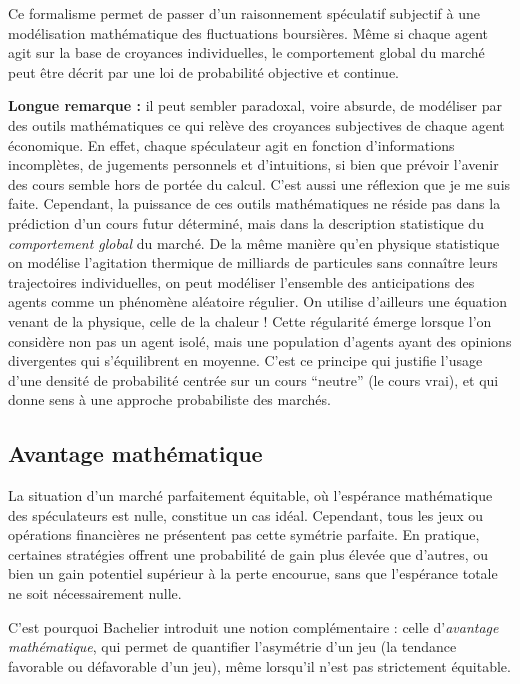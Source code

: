 \documentclass[12pt,a4paper]{article}
\begin{document}
\medskip

Ce formalisme permet de passer d’un raisonnement spéculatif subjectif à une modélisation mathématique des fluctuations boursières. Même si chaque agent agit sur la base de croyances individuelles, le comportement global du marché peut être décrit par une loi de probabilité objective et continue.

\medskip

\noindent
\textbf{Longue remarque : } il peut sembler paradoxal, voire absurde, de modéliser par des outils mathématiques ce qui relève des croyances subjectives de chaque agent économique. En effet, chaque spéculateur agit en fonction d'informations incomplètes, de jugements personnels et d’intuitions, si bien que prévoir l’avenir des cours semble hors de portée du calcul. C'est aussi une réflexion que je me suis faite. Cependant, la puissance de ces outils mathématiques ne réside pas dans la prédiction d’un cours futur déterminé, mais dans la description statistique du \textit{comportement global} du marché. De la même manière qu'en physique statistique on modélise l’agitation thermique de milliards de particules sans connaître leurs trajectoires individuelles, on peut modéliser l'ensemble des anticipations des agents comme un phénomène aléatoire régulier. On utilise d'ailleurs une équation venant de la physique, celle de la chaleur ! Cette régularité émerge lorsque l’on considère non pas un agent isolé, mais une population d’agents ayant des opinions divergentes qui s’équilibrent en moyenne. C’est ce principe qui justifie l’usage d’une densité de probabilité centrée sur un cours ``neutre'' (le cours vrai), et qui donne sens à une approche probabiliste des marchés.

\subsection{Avantage mathématique}

La situation d’un marché parfaitement équitable, où l’espérance mathématique des spéculateurs est nulle, constitue un cas idéal. Cependant, tous les jeux ou opérations financières ne présentent pas cette symétrie parfaite. En pratique, certaines stratégies offrent une probabilité de gain plus élevée que d’autres, ou bien un gain potentiel supérieur à la perte encourue, sans que l’espérance totale ne soit nécessairement nulle.

\medskip

C’est pourquoi Bachelier introduit une notion complémentaire : celle d’\textit{avantage mathématique}, qui permet de quantifier l'asymétrie d'un jeu (la tendance favorable ou défavorable d’un jeu), même lorsqu’il n’est pas strictement équitable.
\end{document}

